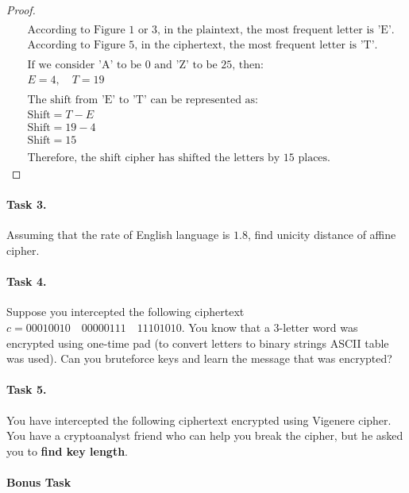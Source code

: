 \documentclass{article}
\begin{document}
\begin{enumerate}
\begin{minipage}{\linewidth}
\begin{proof}
\begin{align*}
              & \\
              &\text{According to Figure 1 or 3, in the plaintext, the most frequent letter is 'E'.} \\
              &\text{According to Figure 5, in the ciphertext, the most frequent letter is 'T'.} \\
              & \\
              &\text{If we consider 'A' to be 0 and 'Z' to be 25, then:} \\
              &E = 4, \quad T = 19 \\
              & \\
              &\text{The shift from 'E' to 'T' can be represented as:} \\
              &\text{Shift} = T - E \\
              &\text{Shift} = 19 - 4 \\
              &\text{Shift} = 15 \\
              & \\
              &\text{Therefore, the shift cipher has shifted the letters by 15 places.}
            \end{align*}
          \end{proof}
    \end{minipage}
\end{enumerate}


\paragraph{Task 3.} Assuming that the rate of English language is $1.8$, find unicity distance of affine cipher.

\paragraph{Task 4.} Suppose you intercepted the following ciphertext $c = 00010010 \quad 00000111 \quad 11101010$. You know that a 3-letter word was encrypted using one-time pad (to convert letters to binary strings ASCII table was used). Can you bruteforce keys and learn the message that was encrypted?

\paragraph{Task 5.}
You have intercepted the following ciphertext encrypted using Vigenere cipher. You have a cryptoanalyst friend who can help you break the cipher, but he asked you to \textbf{find key length}. \\

\paragraph{Bonus Task} 
\end{document}
